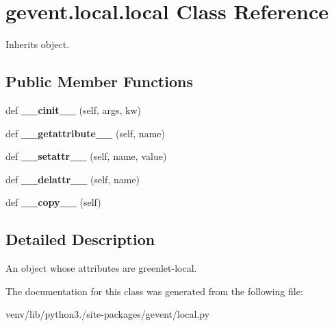 \hypertarget{classgevent_1_1local_1_1local}{}\section{gevent.\+local.\+local Class Reference}
\label{classgevent_1_1local_1_1local}


Inherits object.

\subsection*{Public Member Functions}
\begin{DoxyCompactItemize}
\item 
\mbox{\label{classgevent_1_1local_1_1local_aae90c383061f27798cda819ee905a4ca}} 
def {\bfseries \+\_\+\+\_\+cinit\+\_\+\+\_\+} (self, args, kw)
\item 
\mbox{\label{classgevent_1_1local_1_1local_a3229788d9696e913b926090a2d01d7de}} 
def {\bfseries \+\_\+\+\_\+getattribute\+\_\+\+\_\+} (self, name)
\item 
\mbox{\label{classgevent_1_1local_1_1local_a323b007e06a9984a65d8b7ff2868b95f}} 
def {\bfseries \+\_\+\+\_\+setattr\+\_\+\+\_\+} (self, name, value)
\item 
\mbox{\label{classgevent_1_1local_1_1local_ac29b3c0889d3aee58982033c193958ff}} 
def {\bfseries \+\_\+\+\_\+delattr\+\_\+\+\_\+} (self, name)
\item 
\mbox{\label{classgevent_1_1local_1_1local_abe20bf32e58af08d77c7fba2356e1528}} 
def {\bfseries \+\_\+\+\_\+copy\+\_\+\+\_\+} (self)
\end{DoxyCompactItemize}


\subsection{Detailed Description}
\begin{DoxyVerb}An object whose attributes are greenlet-local.
\end{DoxyVerb}
 

The documentation for this class was generated from the following file\+:\begin{DoxyCompactItemize}
\item 
venv/lib/python3./site-\/packages/gevent/local.\+py\end{DoxyCompactItemize}
